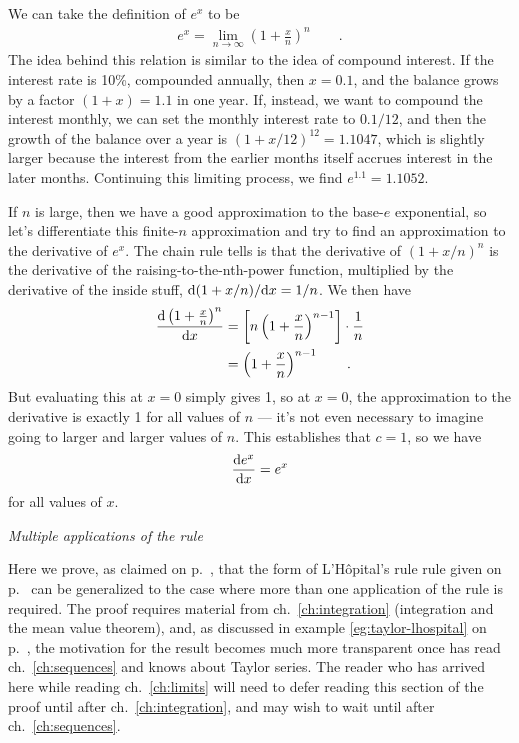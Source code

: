 We can take the definition of $e^x$ to be\label{definition-of-exp}
\begin{align*}
  e^x = \lim_{n\rightarrow \infty} \left(1+\frac{x}{n}\right)^n \qquad .
\end{align*}
The idea behind this relation is similar to the idea of compound interest. If the interest rate is 10\%, compounded
annually, then $x=0.1$, and the balance grows by a factor $(1+x)=1.1$ in one year. If, instead, we want to compound the
interest monthly, we can set the monthly interest rate to $0.1/12$, and then the growth of the
balance over a year is $(1+x/12)^{12}=1.1047$, which is slightly larger because the interest from the earlier months
itself accrues interest in the later months. Continuing this limiting process, we find $e^{1.1}=1.1052$.

If $n$ is large, then we have a good approximation to the base-$e$ exponential, so let's differentiate
this finite-$n$ approximation and try to find an approximation to the derivative of $e^x$. The chain rule
tells is that the derivative of $(1+x/n)^n$ is the derivative of the raising-to-the-nth-power function,
multiplied by the derivative of the inside stuff, $\textup{d}(1+x/n)/\textup{d} x=1/n$. We then have
\begin{align*}
  \frac{\textup{d} \left(1+\frac{x}{n}\right)^n}{\textup{d} x} &= \left[n\left(1+\frac{x}{n}\right)^{n-1}\right]\cdot \frac{1}{n} \\
            &= \left(1+\frac{x}{n}\right)^{n-1} \qquad .
\end{align*}
But evaluating this at $x=0$ simply gives 1, so at $x=0$, the approximation to the derivative is exactly 1 for all values of
$n$ --- it's not even necessary to imagine going to larger and larger values of $n$. This establishes that $c=1$,
so we have
\begin{equation*}
  \frac{\textup{d} e^x}{\textup{d} x} = e^x 
\end{equation*}
for all values of $x$.

\emph{Multiple applications of the rule}

Here we prove, as claimed on p.~\pageref{lhospital-multiple}, that the form of L'H\^{o}pital's rule rule given
on p.~\pageref{lhospital-simple} can be generalized to the case where more than one application of the
rule is required. The proof requires material from ch.~\ref{ch:integration} (integration and the mean value theorem),
and, as discussed in example \ref{eg:taylor-lhospital} on p.~\pageref{eg:taylor-lhospital}, 
the motivation for the result becomes much more transparent once has read ch.~\ref{ch:sequences} and knows
about Taylor series. The reader who has arrived here while reading ch.~\ref{ch:limits} will need to defer reading
this section of the proof until after ch.~\ref{ch:integration}, and may wish to wait until after ch.~\ref{ch:sequences}.

